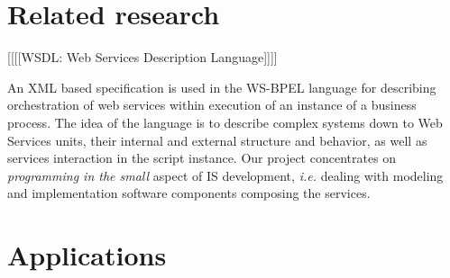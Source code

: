 \documentclass[conference,a4paper]{IEEEtran}
\begin{document}
\section{Related research}
\label{sec:rel}

[[[[WSDL: Web Services Description Language]]]]

An XML based specification is used in the WS-BPEL language \cite{wsbpel} for describing orchestration of web services within execution of an instance of a business process.  The idea of the language is to describe complex systems down to Web Services units, their internal and external structure and behavior, as well as services interaction in the script instance. Our project concentrates on \emph{programming in the small} aspect of IS development, \emph{i.e.} dealing with modeling and implementation software components composing the services.


\section{Applications}
\label{sec:app}







%
%
\end{document}
